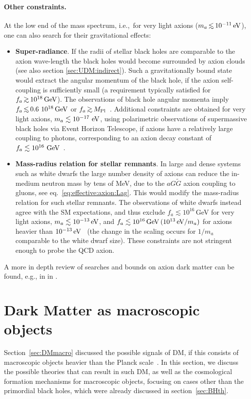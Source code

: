 \paragraph{Other constraints.} 
At the low end of the mass spectrum, i.e.,~for very light axions ($m_a \circa{<}10^{-11}\eV$), one can also search for their gravitational effects: 
\begin{itemize}
\item[$-$]
{\bf Super-radiance}. If the radii of stellar black holes are comparable to the axion wave-length the black holes would become surrounded by axion clouds (see also section \ref{sec:UDM:indirect}).
Such a gravitationally bound state would extract the angular momentum of the black hole,
if the axion self-coupling is sufficiently small 
(a requirement typically satisfied for $f_a \circa{>} 10^{18}\GeV$).
The observations of black hole angular momenta imply 
$f_a \circa{<} 0.6~10^{18}\GeV$ or $f_a \circa{>} M_{\rm Pl}$~\cite{axion:BH}. 
Additional constraints are obtained for very light axions, $m_a\lesssim 10^{-17}\,\,{\rm eV}$, using polarimetric observations of supermassive black holes via Event Horizon Telescope, if axions have a relatively large coupling to photons, corresponding to an axion decay constant of $f_a\lesssim 10^{16}\,\,{\rm GeV}$~\cite{axion:BH}.

\item[$-$]
{\bf Mass-radius relation for stellar remnants}. 
In large and dense systems such as white dwarfs the large number density of axions 
can reduce the in-medium neutron mass by tens of MeV,
due to the $a G\tilde G$ axion coupling to gluons, see eq.~\eqref{eq:effective:axion:Lag}.
This would modify the mass-radius relation for such stellar remnants. 
The observations of white dwarfs instead agree with the SM expectations, 
and thus exclude
$f_a\lesssim 10^{16}$\,GeV for very light axions, $m_a\lesssim 10^{-13}\,{\rm eV}$, 
and  $f_a\lesssim 10^{16}\,{\rm GeV} \,(10^{13}\,\text{eV}/m_a)$ for axions heavier than $10^{-13}\,{\rm eV}$~\cite{axion:WD:mass-radius} (the change in the scaling occurs for $1/m_a$ comparable to the white dwarf size).
These constraints are not stringent enough to probe the QCD axion.
\end{itemize}
A more in depth review of searches and bounds on axion dark matter can be found, e.g., in  in \cite{otherpastDMreviews}.


\section{Dark Matter as macroscopic objects}
\label{sec:MacroCompositeDMth}
Section~\ref{sec:DMmacro} discussed the possible signals of DM, if this consists of macroscopic objects heavier than the Planck scale~\cite{MacroscopicDM}.
In this section, we discuss the possible theories that can result in such DM, as well as the cosmological formation mechanisms for macroscopic objects, focusing on 
cases other than the primordial black holes, which were already discussed in section~\ref{sec:BHth}.


